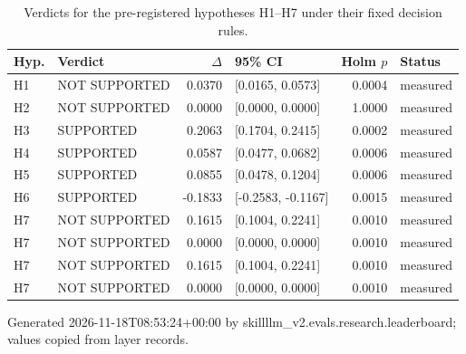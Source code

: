 \begin{table}[H]
\centering
\small
\caption{Verdicts for the pre-registered hypotheses H1--H7 under their fixed decision rules.}
\label{tab:evaluation-hypotheses}
\begin{tabular}{llrlrl}
\toprule
Hyp. & Verdict & $\Delta$ & 95\% CI & Holm $p$ & Status \\
\midrule
H1 & NOT SUPPORTED & 0.0370 & [0.0165, 0.0573] & 0.0004 & measured \\
H2 & NOT SUPPORTED & 0.0000 & [0.0000, 0.0000] & 1.0000 & measured \\
H3 & SUPPORTED & 0.2063 & [0.1704, 0.2415] & 0.0002 & measured \\
H4 & SUPPORTED & 0.0587 & [0.0477, 0.0682] & 0.0006 & measured \\
H5 & SUPPORTED & 0.0855 & [0.0478, 0.1204] & 0.0006 & measured \\
H6 & SUPPORTED & -0.1833 & [-0.2583, -0.1167] & 0.0015 & measured \\
H7 & NOT SUPPORTED & 0.1615 & [0.1004, 0.2241] & 0.0010 & measured \\
H7 & NOT SUPPORTED & 0.0000 & [0.0000, 0.0000] & 0.0010 & measured \\
H7 & NOT SUPPORTED & 0.1615 & [0.1004, 0.2241] & 0.0010 & measured \\
H7 & NOT SUPPORTED & 0.0000 & [0.0000, 0.0000] & 0.0010 & measured \\
\bottomrule
\end{tabular}
\par\smallskip\footnotesize Generated 2026-11-18T08:53:24+00:00 by skillllm\_v2.evals.research.leaderboard; values copied from layer records.
\end{table}

